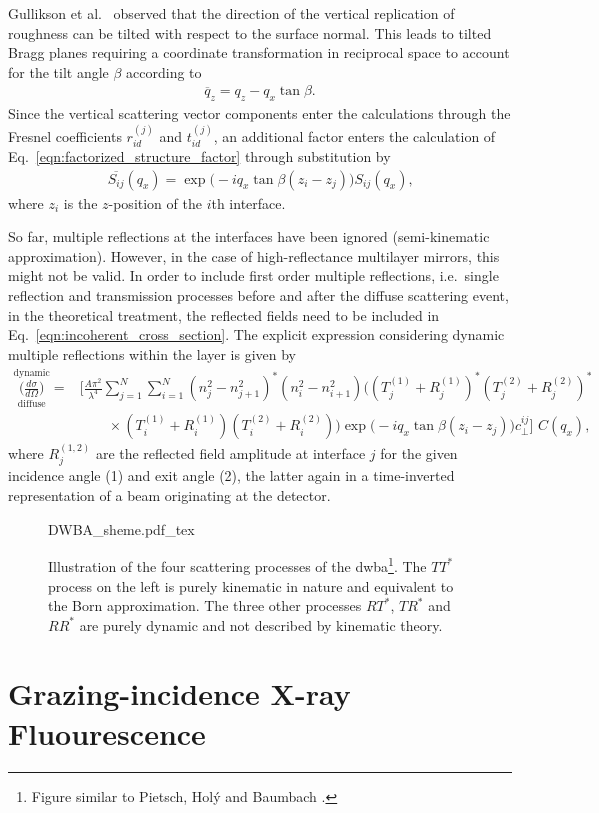 Gullikson et al.~\cite{PhysRevB.59.13273} observed that the direction of the vertical replication of roughness can be tilted with respect to the surface normal. This leads to tilted Bragg planes requiring a coordinate transformation in reciprocal space to account for the tilt angle $\beta$ according to
\begin{align}
\overline{q}_z = q_z - q_x \tan \beta\text{.}
\end{align}
Since the vertical scattering vector components enter the calculations through the Fresnel coefficients $r_{id}^{(j)}$ and $t_{id}^{(j)}$, an additional factor enters the calculation of Eq.~\eqref{eqn:factorized_structure_factor} through substitution by
\begin{align}
\overline{S_{ij}}(q_x) = \exp\Big(-i q_x \tan \beta (z_i-z_j)\Big)  S_{ij}(q_x) \text{,} \label{eqn:tilt_correction}
\end{align}
where $z_i$ is the $z$-position of the $i$th interface.

So far, multiple reflections at the interfaces have been ignored (semi-kinematic approximation). However, in the case of high-reflectance multilayer mirrors, this might not be valid. In order to include first order multiple reflections, i.e.~single reflection and transmission processes before and after the diffuse scattering event, in the theoretical treatment, the reflected fields need to be included in Eq.~\eqref{eqn:incoherent_cross_section}. The explicit expression considering dynamic multiple reflections within the layer is given by
    \begin{align}
        \overset{\text{dynamic}}{\underset{\text{diffuse}}{\Big(\frac{d \sigma}{d \Omega}\Big)}} = &\Bigg[\frac{A \pi^2}{\lambda^4}\sum \limits_{j=1}^{N}\sum \limits_{i=1}^{N} (n_j^2 - n_{j+1}^2)^* (n_i^2 - n_{i+1}^2)\Big( (T^{(1)}_j + R^{(1)}_j)^* (T^{(2)}_j + R^{(2)}_j)^* \nonumber \\ &\qquad\times(T^{(1)}_i + R^{(1)}_i) (T^{(2)}_i + R^{(2)}_i) \Big) \exp\Big(-i q_x \tan \beta (z_i-z_j)\Big) c_\perp^{i j}\Bigg]\,\, C(q_x) \text{,} \label{eqn:multilayer_enhancement_factor}
    \end{align}
where $R^{(1,2)}_j$ are the reflected field amplitude at interface $j$ for the given incidence angle (1) and exit angle (2), the latter again in a time-inverted representation of a beam originating at the detector.

\begin{figure*}[htb]
    \def\svgwidth{\textwidth}
    {DWBA_sheme.pdf_tex}
    \caption{Illustration of the four scattering processes of the \gls{dwba}\footnote{Figure similar to Pietsch, Hol\'{y} and Baumbach \cite{pietsch_high-resolution_2004}.}. The $T T^*$ process on the left is purely kinematic in nature and equivalent to the Born approximation. The three other processes $RT^*$, $TR^*$ and $RR^*$ are purely dynamic and not described by kinematic theory.}
    \label{ch_theo:fig_dwba_scheme}
\end{figure*}

\section{Grazing-incidence X-ray Fluourescence}
\cite{sherman_theoretical_1955, shiraiwa_theoretical_1966, de_boer_glancing-incidence_1991}